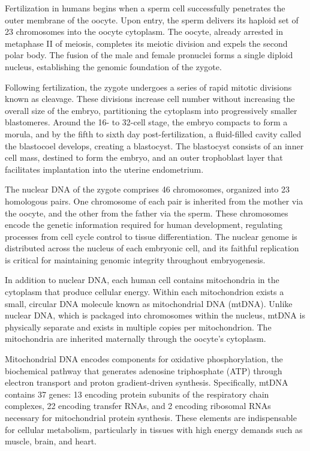 Fertilization in humans begins when a sperm cell successfully penetrates the outer membrane of the oocyte. Upon entry, the sperm delivers its haploid set of 23 chromosomes into the oocyte cytoplasm. The oocyte, already arrested in metaphase II of meiosis, completes its meiotic division and expels the second polar body. The fusion of the male and female pronuclei forms a single diploid nucleus, establishing the genomic foundation of the zygote.

Following fertilization, the zygote undergoes a series of rapid mitotic divisions known as cleavage. These divisions increase cell number without increasing the overall size of the embryo, partitioning the cytoplasm into progressively smaller blastomeres. Around the 16- to 32-cell stage, the embryo compacts to form a morula, and by the fifth to sixth day post-fertilization, a fluid-filled cavity called the blastocoel develops, creating a blastocyst. The blastocyst consists of an inner cell mass, destined to form the embryo, and an outer trophoblast layer that facilitates implantation into the uterine endometrium.

The nuclear DNA of the zygote comprises 46 chromosomes, organized into 23 homologous pairs. One chromosome of each pair is inherited from the mother via the oocyte, and the other from the father via the sperm. These chromosomes encode the genetic information required for human development, regulating processes from cell cycle control to tissue differentiation. The nuclear genome is distributed across the nucleus of each embryonic cell, and its faithful replication is critical for maintaining genomic integrity throughout embryogenesis.

In addition to nuclear DNA, each human cell contains mitochondria in the cytoplasm that produce cellular energy. Within each mitochondrion exists a small, circular DNA molecule known as mitochondrial DNA (mtDNA). Unlike nuclear DNA, which is packaged into chromosomes within the nucleus, mtDNA is physically separate and exists in multiple copies per mitochondrion. The mitochondria are inherited maternally through the oocyte's cytoplasm.

Mitochondrial DNA encodes components for oxidative phosphorylation, the biochemical pathway that generates adenosine triphosphate (ATP) through electron transport and proton gradient-driven synthesis. Specifically, mtDNA contains 37 genes: 13 encoding protein subunits of the respiratory chain complexes, 22 encoding transfer RNAs, and 2 encoding ribosomal RNAs necessary for mitochondrial protein synthesis. These elements are indispensable for cellular metabolism, particularly in tissues with high energy demands such as muscle, brain, and heart.

